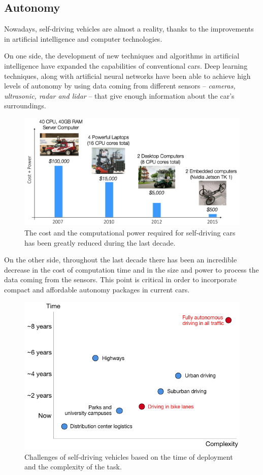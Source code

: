 \subsection{Autonomy}

Nowadays, self-driving vehicles are almost a reality, thanks to the improvements in artificial intelligence and computer technologies. 

On one side, the development of new techniques and algorithms in artificial intelligence have expanded the capabilities of conventional cars. Deep learning techniques, along with artificial neural networks have been able to achieve high levels of autonomy by using data coming from different sensors -- \textit{cameras, ultrasonic, radar and lidar} -- that give enough information about the car's surroundings.

\begin{figure}[h]
	\includegraphics[width=\linewidth]{figs/01/computerCost2}
	\caption{The cost and the computational power required for self-driving cars has been greatly reduced during the last decade.}
\end{figure}

On the other side, throughout the last decade there has been an incredible decrease in the cost of computation time and in the size and power to process the data coming from the sensors. This point is critical in order to incorporate compact and affordable autonomy packages in current cars.

\begin{figure}[h]
	\includegraphics[width=\linewidth]{figs/01/autonomy_speed2}
	\caption{Challenges of self-driving vehicles based on the time of deployment and the complexity of the task.}
\end{figure}


